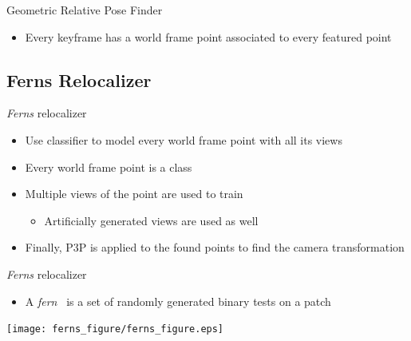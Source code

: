 \begin{frame}[t]{Geometric Relative Pose Finder}
  \begin{itemize}
    \item Every keyframe has a world frame point associated to every featured point
  \end{itemize}




\end{frame}

\subsection{Ferns Relocalizer}

\begin{frame}[t]{\textit{Ferns} relocalizer}

  \begin{itemize}
    \item Use classifier to model every world frame point with all its views
    \item Every world frame point is a class
    \item Multiple views of the point are used to train
      \begin{itemize}
        \item Artificially generated views are used as well
      \end{itemize}
    \item Finally, P3P is applied to the found points to find the camera transformation
  \end{itemize}


\end{frame}

\begin{frame}[t]{\textit{Ferns} relocalizer}
  \begin{itemize}
    \item A \textit{fern}~\cite{Ozuysal2010} is a set of randomly generated binary tests on a patch
  \end{itemize}

  \centering
  \texttt{[image: ferns\_figure/ferns\_figure.eps]}
\end{frame}



